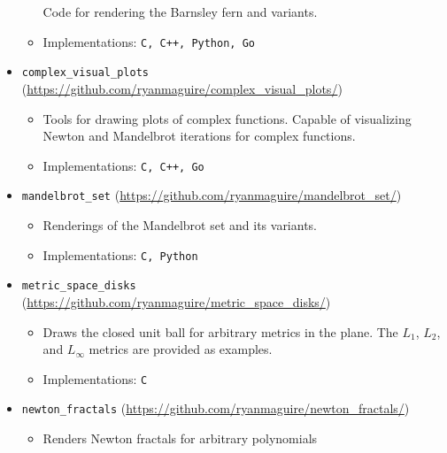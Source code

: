 \documentclass[a4paper,sans]{moderncv}
\begin{document}
\begin{itemize}
\begin{itemize}
                        Code for rendering the Barnsley fern and variants.
                    \item
                        Implementations: \texttt{C, C++, Python, Go}
                \end{itemize}
            \item
                \texttt{complex\_visual\_plots} (\url{https://github.com/ryanmaguire/complex_visual_plots/})
                \begin{itemize}
                    \item
                        Tools for drawing plots of complex functions. Capable
                        of visualizing Newton and Mandelbrot iterations for
                        complex functions.
                    \item
                        Implementations: \texttt{C, C++, Go}
                \end{itemize}
            \item
                \texttt{mandelbrot\_set} (\url{https://github.com/ryanmaguire/mandelbrot_set/})
                \begin{itemize}
                    \item
                        Renderings of the Mandelbrot set and its variants.
                    \item
                        Implementations: \texttt{C, Python}
                \end{itemize}
            \item
                \texttt{metric\_space\_disks} (\url{https://github.com/ryanmaguire/metric_space_disks/})
                \begin{itemize}
                    \item
                        Draws the closed unit ball for arbitrary metrics in the
                        plane. The $L_{1}$, $L_{2}$, and $L_{\infty}$ metrics
                        are provided as examples.
                    \item
                        Implementations: \texttt{C}
                \end{itemize}
            \item
                \texttt{newton\_fractals} (\url{https://github.com/ryanmaguire/newton_fractals/})
                \begin{itemize}
                    \item
                        Renders Newton fractals for arbitrary polynomials

\end{itemize}
\end{itemize}
\end{document}
